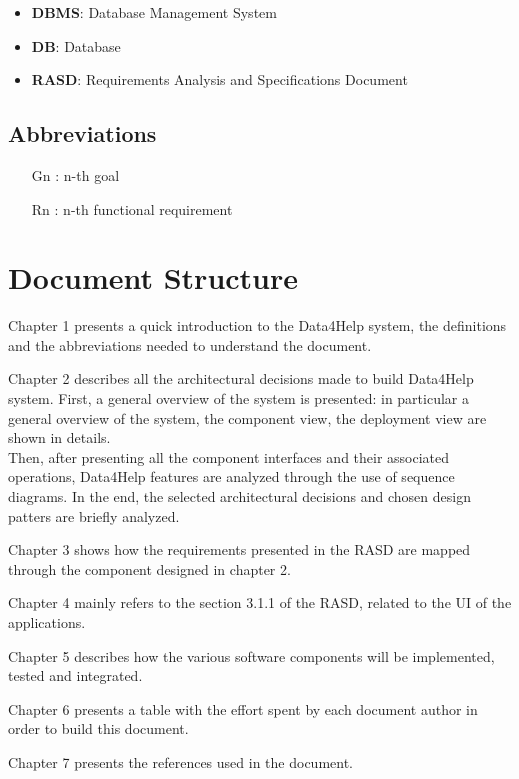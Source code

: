 \begin{itemize}
\item \textbf{DBMS}: Database Management System
\item \textbf{DB}: Database
\item \textbf{RASD}: Requirements Analysis and Specifications Document
\end{itemize}


\subsection{Abbreviations}
\begin{itemize}
\item[Gn]: n-th goal
\item[Rn]: n-th functional requirement
\end{itemize}



\section{Document Structure}
Chapter 1 presents a quick introduction to the Data4Help system, the definitions and the abbreviations needed to understand the document.


Chapter 2 describes all the architectural decisions made to build Data4Help system. First, a general overview of the system is presented: in particular a general overview of the system, the component view, the deployment view are shown in details.\\
Then, after presenting all the component interfaces and their associated operations, Data4Help features are analyzed through the use of sequence diagrams.
In the end, the selected architectural decisions and chosen design patters are briefly analyzed.


Chapter 3 shows how the requirements presented in the RASD are mapped through the component designed in chapter 2.


Chapter 4 mainly refers to the section 3.1.1 of the RASD, related to the UI of the applications.


Chapter 5 describes how the various software components will be implemented, tested and integrated.


Chapter 6 presents a table with the effort spent by each document author in order to build this document.


Chapter 7 presents the references used in the document.